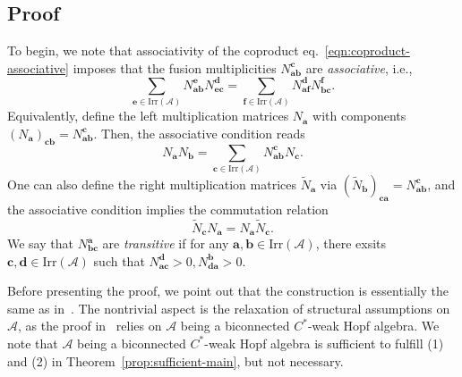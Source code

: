 \documentclass[prx, twocolumn, superscriptaddress, dvipsnames]{revtex4-2}
\theoremstyle{definition}
\newcommand{\mA}{\mathcal{A}}
\newcommand{\vbnt}{\mathbf{a}}
\def\XQ#1{{\color{XQ}#1}}
\begin{document}
\subsection{Proof}

To begin, we note that associativity of the coproduct eq.~\eqref{eqn:coproduct-associative} imposes that the fusion multiplicities $N_{\mathbf{ab}}^\mathbf{c}$ are \textit{associative}, i.e.,
\begin{equation}
    \sum_{\mathbf{e}\in\text{Irr}(\mA)} N_{\mathbf{ab}}^\mathbf{e} N_{\mathbf{ec}}^\mathbf{d} = \sum_{\mathbf{f}\in\text{Irr}(\mA)}N_{\mathbf{af}}^\mathbf{d} N_{\mathbf{bc}}^\mathbf{f} .
\end{equation}
Equivalently, define the left multiplication matrices $N_\vbnt$ with components $(N_\vbnt)_{\mathbf{cb}}=N_{\mathbf{ab}}^\mathbf{c}$. 
Then, the associative condition reads
\begin{equation}
\label{eqn:N-algebra}
    N_\vbnt N_\mathbf{b} = \sum_{\mathbf{c}\in\text{Irr}(\mA)} N^\mathbf{c}_{\mathbf{ab}} N_\mathbf{c}.
\end{equation}
One can also define the right multiplication matrices $\tilde{N}_\vbnt$ via $(\tilde{N}_\mathbf{b})_{\mathbf{ca}}=N_{\mathbf{ab}}^\mathbf{c}$, and the associative condition implies the commutation relation
\begin{equation}
    \tilde{N}_\mathbf{c} N_\mathbf{a} = N_\mathbf{a} \tilde{N}_\mathbf{c}.
\end{equation}
We say that $N_{\mathbf{bc}}^\mathbf{a}$ are \textit{transitive} if for any $\mathbf{a,b}\in\text{Irr}(\mA)$, there exsits $\mathbf{c,d}\in\text{Irr}(\mA)$ such that $N_{\mathbf{ac}}^\mathbf{d}>0, N_{\mathbf{da}}^\mathbf{b}>0$. 



Before presenting the proof, we point out that the construction is essentially the same as in~\cite{ruiz2024matrix}. The nontrivial aspect is the relaxation of structural assumptions on $\mA$, as the proof in~\cite{ruiz2024matrix} relies on $\mA$ being a biconnected $C^*$-weak Hopf algebra. We note that $\mA$ being a biconnected $C^*$-weak Hopf algebra is sufficient to fulfill (1) and (2) in Theorem~\ref{prop:sufficient-main}, but not necessary.
\end{document}
